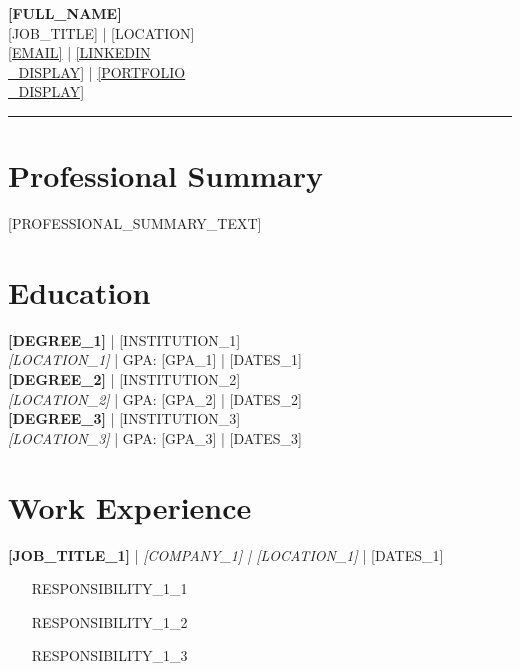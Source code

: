 \documentclass[11pt,a4paper]{article}
\begin{document}
\begin{center}
    {\Huge\bfseries\color{primary} [FULL\_NAME]}\\[0.3cm]
    {\large\color{secondary} [JOB\_TITLE]} | {\large\color{secondary} [LOCATION]}\\[0.2cm]
    {\normalsize\color{secondary} \href{mailto:[EMAIL]}{[EMAIL]} | \href{[LINKEDIN\\_URL]}{[LINKEDIN\\_DISPLAY]} | \href{[PORTFOLIO\\_URL]}{[PORTFOLIO\\_DISPLAY]}}\\[0.3cm]
    \rule{\textwidth}{1pt}
\end{center}

\vspace{8pt}

\section{Professional Summary}
\vspace{4pt}
[PROFESSIONAL_SUMMARY\_TEXT]

\vspace{8pt}

\section{Education}
\textbf{[DEGREE\_1]} | [INSTITUTION\_1]\\[0.2cm]
\textit{[LOCATION\_1]} | GPA: [GPA\_1] | [DATES\_1]\\[0.3cm]

\textbf{[DEGREE\_2]} | [INSTITUTION\_2]\\[0.2cm]
\textit{[LOCATION\_2]} | GPA: [GPA\_2] | [DATES\_2]\\[0.3cm]

\textbf{[DEGREE\_3]} | [INSTITUTION\_3]\\[0.2cm]
\textit{[LOCATION\_3]} | GPA: [GPA\_3] | [DATES\_3]\\[0.3cm]

\vspace{8pt}

\section{Work Experience}
\textbf{[JOB_TITLE\_1]} | \textit{[COMPANY\_1] | [LOCATION\_1]} | [DATES\_1]\\[0.2cm]
\begin{itemize}[leftmargin=*,noitemsep,topsep=2pt]
    \item [RESPONSIBILITY_1\_1]
    \item [RESPONSIBILITY_1\_2]
    \item [RESPONSIBILITY_1\_3]
\end{itemize}
\end{document}
